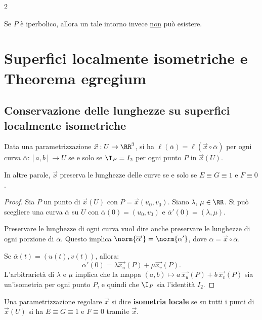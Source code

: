 \begin{multicols*}{2}
\begin{proposition}
        Se $P$ è iperbolico, allora un tale intorno invece \underline{non}
        può esistere.
    \end{proposition}


    \section{Superfici localmente isometriche e Theorema egregium}

    \subsection{Conservazione delle lunghezze su superfici localmente isometriche}

    \begin{proposition}
        Data una parametrizzazione $\vec{x} : U \to \RR^3$,
        si ha $\ell(\overline{\alpha}) = \ell(\vec{x} \circ \overline{\alpha})$
        per ogni curva $\overline{\alpha} : [a, b] \to U$ se e solo se
        $\I_P = I_2$ per ogni punto $P$ in $\vec{x}(U)$. \smallskip

        In altre parole, $\vec{x}$ preserva le lunghezze delle curve se e solo se
        $E \equiv G \equiv 1$ e $F \equiv 0$.
    \end{proposition}

    \begin{proof}
        Sia $P$ un punto di $\vec{x}(U)$ con $P = \vec{x}(u_0, v_0)$. Siano $\lambda$,
        $\mu \in \RR$. Si può scegliere una curva $\overline{\alpha}$ su $U$
        con $\overline{\alpha}(0) = (u_0, v_0)$ e $\overline{\alpha}'(0) = (\lambda, \mu)$. \smallskip

        Preservare le lunghezze di ogni curva vuol dire anche
        preservare le lunghezze di ogni porzione di $\overline{\alpha}$. Questo implica
        $\norm{\overline{\alpha}'} = \norm{\alpha'}$, dove $\alpha = \vec{x} \circ \overline{\alpha}$. \smallskip

        Se $\overline{\alpha}(t) = (u(t), v(t))$, allora:
        \[
            \alpha'(0) = \lambda \vec{x_u}(P) + \mu \vec{x_v}(P).
        \]
        L'arbitrarietà di $\lambda$ e $\mu$ implica
        che la mappa $(a, b) \mapsto a \, \vec{x_u}(P) + b \, \vec{x_v}(P)$ sia
        un'isometria per ogni punto $P$,
        e quindi che $\I_P$ sia l'identità $I_2$.
    \end{proof}

    \begin{definition}
        Una parametrizzazione regolare $\vec{x}$ si dice
        \textbf{isometria locale} se su tutti i punti di
        $\vec{x}(U)$ si ha $E \equiv G \equiv 1$ e $F \equiv 0$
        tramite $\vec{x}$.
    \end{definition}


\end{multicols*}
